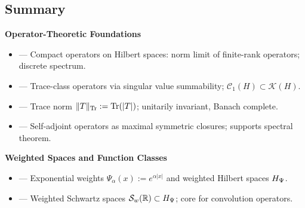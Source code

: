 \subsection*{Summary}
\label{sec:foundations_summary}

\textbf{Operator-Theoretic Foundations}
\begin{itemize}
  \item {} — Compact operators on Hilbert spaces: norm limit of finite-rank operators; discrete spectrum.
  \item {} — Trace-class operators via singular value summability; \( \mathcal{C}_1(H) \subset \mathcal{K}(H) \).
  \item {} — Trace norm \( \|T\|_{\operatorname{Tr}} := \operatorname{Tr}(|T|) \); unitarily invariant, Banach complete.
  \item {} — Self-adjoint operators as maximal symmetric closures; supports spectral theorem.
\end{itemize}

\textbf{Weighted Spaces and Function Classes}
\begin{itemize}
  \item {} — Exponential weights \( \Psi_\alpha(x) := e^{\alpha |x|} \) and weighted Hilbert spaces \( H_{\Psi} \).
  \item {} — Weighted Schwartz spaces \( \mathcal{S}_w(\mathbb{R}) \subset H_{\Psi} \); core for convolution operators.
\end{itemize}

